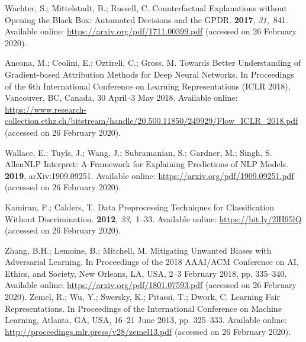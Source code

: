 \documentclass[information,article,accept,moreauthors,pdftex]{Definitions/mdpi}
\begin{document}
\begin{thebibliography}{999}
Wachter, S.; Mittelstadt, B.; Russell, C.
\newblock Counterfactual {E}xplanations without {O}pening the {B}lack {B}ox:
  {A}utomated {D}ecisions and the {G}{P}{D}{R}.
 {\bf 2017}, {\em 31},~841.
\newblock Available online: \url{https://arxiv.org/pdf/1711.00399.pdf} (accessed on 26 February 2020).

Ancona, M.; Ceolini, E.; Oztireli, C.; Gross, M.
\newblock Towards {B}etter {U}nderstanding of {G}radient-based {A}ttribution
  {M}ethods for {D}eep {N}eural {N}etworks.
\newblock  In Proceedings of the 6th International Conference on Learning Representations (ICLR
  2018), Vancouver, BC, Canada, 30 April--3 May 2018. 
\newblock Available online: 
  \url{https://www.research-collection.ethz.ch/bitstream/handle/20.500.11850/249929/Flow_ICLR_2018.pdf} (accessed on 26 February 2020).

Wallace, E.; Tuyls, J.; Wang, J.; Subramanian, S.; Gardner, M.; Singh, S.
\newblock AllenNLP Interpret: A Framework for Explaining Predictions of NLP
  Models.
 {\bf 2019}, arXiv:1909.09251.
\newblock Available online: \url{https://arxiv.org/pdf/1909.09251.pdf} (accessed on 26 February 2020).

Kamiran, F.; Calders, T.
\newblock Data {P}reprocessing {T}echniques for {C}lassification {W}ithout
  {D}iscrimination.
 {\bf 2012}, {\em 33},~1--33.
\newblock Available online: \url{https://bit.ly/2lH95lQ} (accessed on 26 February 2020).

Zhang, B.H.; Lemoine, B.; Mitchell, M.
\newblock Mitigating {U}nwanted {B}iases with {A}dversarial {L}earning.
\newblock  In Proceedings of the 2018 AAAI/ACM Conference on AI, Ethics, and
  Society, New Orleans, LA, USA, 2--3 February 2018, pp. 335--340.
\newblock Available online: \url{https://arxiv.org/pdf/1801.07593.pdf} (accessed on 26 February 2020).
Zemel, R.; Wu, Y.; Swersky, K.; Pitassi, T.; Dwork, C.
\newblock Learning {F}air {R}epresentations.
\newblock In Proceedings of the  International Conference on Machine Learning, Atlanta, GA, USA, 16--21 June 2013, pp. 325--333. %
\newblock Available online: \url{http://proceedings.mlr.press/v28/zemel13.pdf} (accessed on 26 February 2020).


\end{thebibliography}
\end{document}
